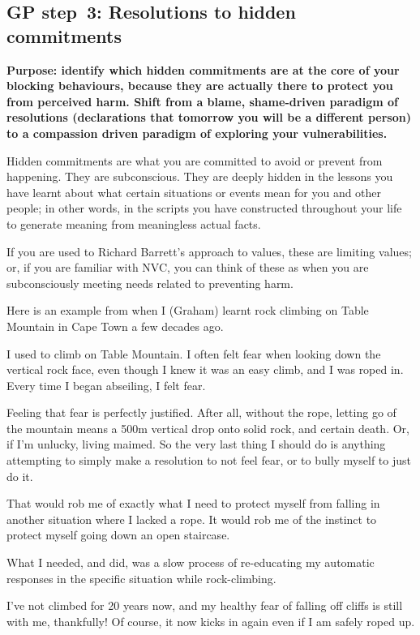 \subsection[GP step~3: Resolutions to hidden commitments]{GP step~3: Resolutions to hidden commitments}


\textbf{Purpose: identify which hidden commitments are at the core of your blocking behaviours, because they are actually there to protect you from perceived harm. Shift from a blame, shame-driven paradigm of resolutions (declarations that tomorrow you will be a different person) to a compassion driven paradigm of exploring your vulnerabilities.} ~


Hidden commitments are what you are committed to avoid or prevent from happening. They are subconscious. They are deeply hidden in the lessons you have learnt about what certain situations or events mean for you and other people; in other words, in the scripts you have constructed throughout your life to generate meaning from meaningless actual facts. 


If you are used to Richard Barrett's approach to values\cite{barrett-values}, these are limiting values; or, if you are familiar with NVC, you can think of these as when you are subconsciously meeting needs related to preventing harm.


Here is an example from when I (Graham) learnt rock climbing on Table Mountain in Cape Town a few decades ago.
\begin{longstoryblock}
I used to climb on Table Mountain. I often felt fear when looking down the vertical rock face, even though I knew it was an easy climb, and I was roped in. Every time I began abseiling, I felt fear. 


Feeling that fear is perfectly justified. After all, without the rope, letting go of the mountain means a 500m vertical drop onto solid rock, and certain death. Or, if I'm unlucky, living maimed. So the very last thing I should do is anything attempting to simply make a resolution to not feel fear, or to bully myself to just do it. 


That would rob me of exactly what I need to protect myself from falling in another situation where I lacked a rope. It would rob me of the instinct to protect myself  going down an open staircase.


What I needed, and did, was a slow process of re-educating my automatic responses in the specific situation while rock-climbing.


I've not climbed for 20 years now, and my healthy fear of falling off cliffs is still with me, thankfully! Of course, it now kicks in again even if I am safely roped up. 
\end{longstoryblock}


